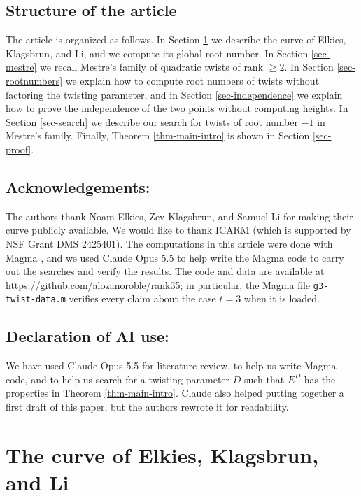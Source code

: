 \documentclass[11pt]{amsart}
\begin{document}
\subsection{Structure of the article} The article is organized as follows. In Section \ref{sec-curve} we describe the curve of Elkies, Klagsbrun, and Li, and we compute its global root number. In Section \ref{sec-mestre} we recall Mestre's family of quadratic twists of rank $\geq 2$. In Section \ref{sec-rootnumbers} we explain how to compute root numbers of twists without factoring the twisting parameter, and in Section \ref{sec-independence} we explain how to prove the independence of the two points without computing heights. In Section \ref{sec-search} we describe our search for twists of root number $-1$ in Mestre's family. Finally, Theorem \ref{thm-main-intro} is shown in Section \ref{sec-proof}.

\subsection{Acknowledgements:}
The authors thank Noam Elkies, Zev Klagsbrun, and Samuel Li for making their curve publicly available. We would like to thank ICARM (which is supported by NSF Grant DMS 2425401). The computations in this article were done with Magma \cite{magma}, and we used Claude  Opus 5.5 to help write the Magma code to carry out the searches and verify the results. The code and data are available at \url{https://github.com/alozanoroble/rank35}; in particular, the Magma file \texttt{g3-twist-data.m} verifies every claim about the case $t=3$ when it is loaded.

\subsection{Declaration of AI use:} We have used Claude Opus 5.5 for literature review, to help us write Magma code, and to help us search for a twisting parameter $D$ such that $E^D$ has the properties in Theorem \ref{thm-main-intro}. Claude also helped putting together a first draft of this paper, but the authors rewrote it for readability. 

\section{The curve of Elkies, Klagsbrun, and Li}\label{sec-curve}
\end{document}
